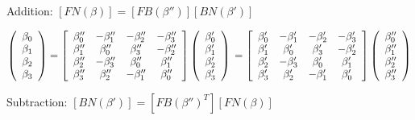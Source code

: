 \documentclass[10pt,landscape]{article}
\begin{document}
\begin{multicols}{3}
Addition:
$ \left[ FN(\beta) \right] = \left[ FB(\beta'') \right] \left[ BN(\beta') \right] $

$
	\left( \begin{array}{c}
		\beta_0 \\ \beta_1 \\ \beta_2 \\ \beta_3
	\end{array} \right)
	=
	\left[ \begin{array}{cccc}
		\beta_0'' & -\beta_1'' & -\beta_2'' & -\beta_3'' \\
		\beta_1'' &  \beta_0'' &  \beta_3'' & -\beta_2'' \\
		\beta_2'' & -\beta_3'' &  \beta_0'' &  \beta_1'' \\
		\beta_3'' &  \beta_2'' & -\beta_1'' &  \beta_0'' 
	\end{array} \right]
	\left( \begin{array}{c}
		\beta_0' \\ \beta_1' \\ \beta_2' \\ \beta_3'
	\end{array} \right) \\
	=
	\left[ \begin{array}{cccc}
		\beta_0' & -\beta_1' & -\beta_2' & -\beta_3' \\
		\beta_1' &  \beta_0' &  \beta_3' & -\beta_2' \\
		\beta_2' & -\beta_3' &  \beta_0' &  \beta_1' \\
		\beta_3' &  \beta_2' & -\beta_1' &  \beta_0' 
	\end{array} \right]
	\left( \begin{array}{c}
		\beta_0'' \\ \beta_1'' \\ \beta_2'' \\ \beta_3''
	\end{array} \right)
$	


Subtraction:
$ \left[ BN(\beta') \right] = \left[ FB(\beta'')^T \right] \left[ FN(\beta) \right] $


\end{multicols}
\end{document}
